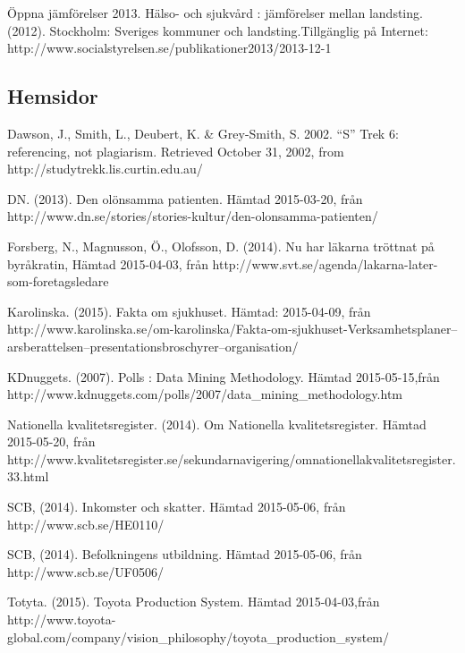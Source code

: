 Öppna jämförelser 2013. Hälso- och sjukvård : jämförelser mellan landsting. (2012). Stockholm: Sveriges kommuner och landsting.Tillgänglig på Internet: http://www.socialstyrelsen.se/publikationer2013/2013-12-1\newline

\subsection{Hemsidor}		 	 	 							

Dawson, J., Smith, L., Deubert, K. \& Grey-Smith, S. 2002. “S” Trek 6: referencing, not plagiarism. Retrieved October 31, 2002, from http://studytrekk.lis.curtin.edu.au/ \newline

DN. (2013). Den olönsamma patienten. Hämtad 2015-03-20, från http://www.dn.se/stories/stories-kultur/den-olonsamma-patienten/\newline

Forsberg, N., Magnusson, Ö., Olofsson, D. (2014). Nu har läkarna tröttnat på byråkratin, Hämtad 2015-04-03, från http://www.svt.se/agenda/lakarna-later-som-foretagsledare\newline
			
Karolinska. (2015). Fakta om sjukhuset. Hämtad: 2015-04-09, från http://www.karolinska.se/om-karolinska/Fakta-om-sjukhuset-Verksamhetsplaner--arsberattelsen--presentationsbroschyrer--organisation/\newline				

KDnuggets. (2007). Polls : Data Mining Methodology. Hämtad 2015-05-15,\newline från http://www.kdnuggets.com/polls/2007/data\_mining\_methodology.htm\newline

Nationella kvalitetsregister. (2014). Om Nationella kvalitetsregister. Hämtad 2015-05-20, från http://www.kvalitetsregister.se/sekundarnavigering/omnationellakvalitetsregister.33.html\newline

SCB, (2014). Inkomster och skatter. Hämtad 2015-05-06, från http://www.scb.se/HE0110/\newline

SCB, (2014). Befolkningens utbildning. Hämtad 2015-05-06, från http://www.scb.se/UF0506/\newline

Totyta. (2015). Toyota Production System. Hämtad 2015-04-03,\newline från http://www.toyota-global.com/company/vision\_philosophy/toyota\_production\_system/\newline

